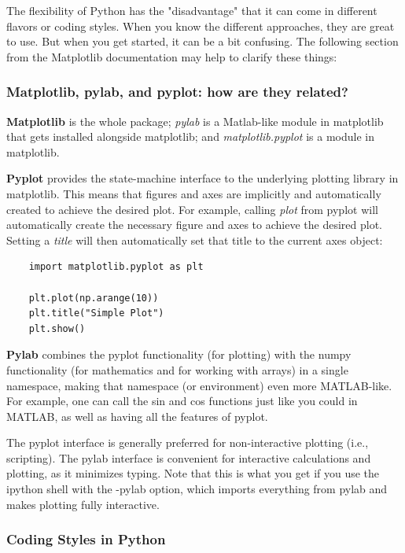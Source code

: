 The flexibility of Python has the "disadvantage" that it can come in
different flavors or coding styles. When you know the different approaches,
they are great to use. But when you get started, it can be a bit confusing.
The following section from the Matplotlib documentation may help to clarify
these things:

\subsubsection{Matplotlib, pylab, and pyplot: how are they related?}

\textbf{Matplotlib} is the whole package; \emph{pylab} is a Matlab-like module in matplotlib that gets installed alongside matplotlib; and \emph{matplotlib.pyplot} is a module in matplotlib.

\textbf{Pyplot} provides the state-machine interface to the underlying plotting library in matplotlib. This means that figures and axes are implicitly and automatically created to achieve the desired plot. For example, calling \emph{plot }from pyplot will automatically create the necessary figure and axes to achieve the desired plot. Setting a \emph{title }will then automatically set that title to the current axes object:

\begin{lstlisting}
    import matplotlib.pyplot as plt

    plt.plot(np.arange(10))
    plt.title("Simple Plot")
    plt.show()
\end{lstlisting}

\textbf{Pylab} combines the pyplot functionality (for plotting) with the numpy functionality (for mathematics and for working with arrays) in a single namespace, making that namespace (or environment) even more MATLAB-like. For example, one can call the sin and cos functions just like you could in MATLAB, as well as having all the features of pyplot.

The pyplot interface is generally preferred for non-interactive plotting (i.e., scripting). The pylab interface is convenient for interactive calculations and plotting, as it minimizes typing. Note that this is what you get if you use the ipython shell with the -pylab option, which imports everything from pylab and makes plotting fully interactive.


\subsubsection{Coding Styles in Python}

